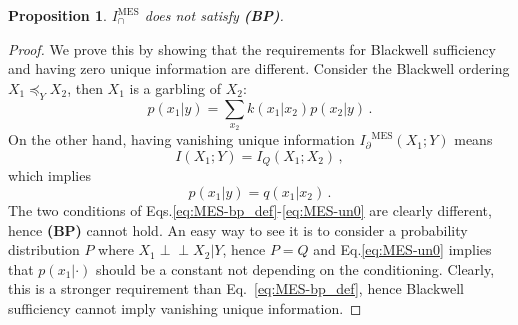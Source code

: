 \documentclass{article}
\newcommand{\ind}{\mathrel{\perp\!\!\!\perp}}
\newcommand{\Ip}{\ensuremath{I_\partial}\xspace}
\newcommand{\BP}{\textbf{(BP)}\xspace} %
\newcommand{\IMES}{\ensuremath{I_\cap^{\text{MES}}}\xspace}
\newtheorem{proposition}{Proposition}
\begin{document}
\begin{proposition} \label{prop:MES-noBP}
    $\IMES$ does not satisfy \BP.
\end{proposition}
\begin{proof}
    We prove this by showing that the requirements for Blackwell sufficiency and having zero unique information are different. 
    Consider the Blackwell ordering $X_1\preceq_YX_2$, then $X_1$ is a garbling of $X_2$:
    \begin{equation} \label{eq:MES-bp_def}
        p(x_1|y) = \sum_{x_2} k(x_1|x_2)p(x_2|y) \,.
    \end{equation}
    On the other hand, having vanishing unique information $\Ip^\text{MES}(X_1;Y)$ means 
    \begin{equation}
        I(X_1;Y) = I_Q(X_1;X_2) \,,
    \end{equation}
    which implies 
    \begin{equation} \label{eq:MES-un0}
        p(x_1|y) = q(x_1|x_2) \,.
    \end{equation}
    The two conditions of Eqs.\eqref{eq:MES-bp_def}-\eqref{eq:MES-un0} are clearly different, hence \BP cannot hold. An easy way to see it is to consider a probability distribution $P$ where $X_1\ind X_2|Y$, hence $P=Q$ and Eq.\eqref{eq:MES-un0} implies that $p(x_1|\cdot)$ should be a constant not depending on the conditioning. Clearly, this is a stronger requirement than Eq.~\ref{eq:MES-bp_def}, hence Blackwell sufficiency cannot imply vanishing unique information.
\end{proof}
\end{document}
